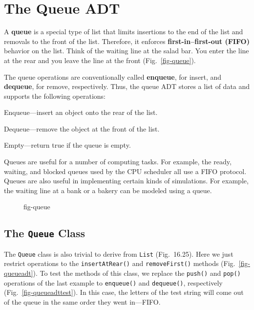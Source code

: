 \section{The {Queue} ADT}
\label{the-adt}
\noindent A {\bf queue} is a special type of list that
limits insertions to the end of the list and removals to the front of
the list.  Therefore, it enforces {\bf first-in--first-out
(FIFO)} behavior on the list.  Think
of the waiting line at the salad bar.  You enter the line at the rear
and you leave the line at the front (Fig.~\ref{fig-queue}).  

\begin{minipage}{27pc}
The queue operations are conventionally called {\bf
enqueue}, for insert, and {\bf dequeue},
for remove, respectively.  Thus, the queue ADT stores a list of data
and supports the following operations:

\begin{BL}
\item  Enqueue---insert an object onto the rear of the list.
\item  Dequeue---remove the object at the front of the list.
\item  Empty---return true if the queue is empty.
\end{BL}
\end{minipage}

Queues are useful for a number of computing tasks.  For example, the
ready, waiting, and blocked queues used by the CPU scheduler all use a
FIFO protocol.   Queues are also useful in implementing certain kinds
of simulations.  For example, the waiting line at a bank or a bakery
can be modeled using a queue.

\begin{figure}[h!]
{fig-queue}
\end{figure}

\pagebreak
\subsection{The {\tt Queue} Class}

\noindent The {\tt Queue} class is also trivial to derive
from {\tt List} (Fig.~16.25).  Here we just restrict operations to
the {\tt insertAtRear()} and {\tt removeFirst()} methods
(Fig.~\ref{fig-queueadt}).  To test the methods of this class, we
replace the {\tt push()} and {\tt pop()} operations of 
the last example to {\tt enqueue()} and {\tt dequeue()}, respectively
(Fig.~\ref{fig-queueadttest}).  In this case, the letters of the test
string will come out of the queue in the same order they went
in---FIFO.


